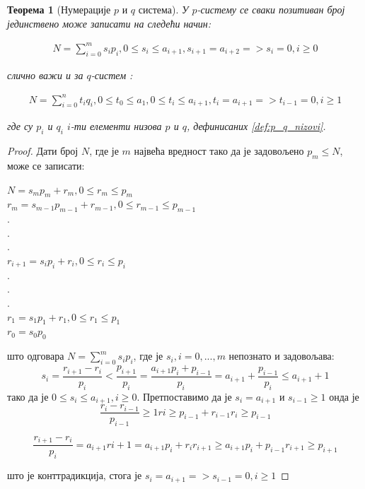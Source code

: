 \documentclass[a4paper]{article}
\newtheorem{theorem}{Теорема}
\begin{document}
\begin{theorem}[Нумерације $ p $ и $ q $ система]
	\label{thm:p_q_sistemi}
	У $ p $-систему се сваки позитиван број јединствено може записати на следећи начин:
	
	\begin{eqnarray}
		N = \sum_{i=0}^{m} s_{i}p_{i}, 0 \le s_{i} \le a_{i+1}, s_{i+1} = a_{i+2} => s_{i}=0 , i \ge 0
	\end{eqnarray}
	
	слично важи и за $ q $-систем :
	
	\begin{eqnarray}
		N = \sum_{i=0}^{n} t_{i}q_{i}, 0 \le t_{0} \le a_{1}, 0 \le t_{i} \le a_{i+1}, t_{i} = a_{i+1} => t_{i-1}=0 , i \ge 1
	\end{eqnarray}
	
	где су $ p_{i} $ и $ q_{i} $ $ i $-ти елементи низова $ p $ и $ q $, дефинисаних \ref{def:p_q_nizovi}.
\end{theorem} 

\begin{proof}
	Дати број $ N $, где је $ m $ највећа вредност тако да је задовољено $ p_{m} \leq N $, може се записати:
	\begin{center}
		$ N = s_{m}p_{m} + r_{m}, 0 \leq r_{m} \le p_{m} $\\
		$ r_{m} = s_{m-1}p_{m-1} + r_{m-1}, 0 \leq r_{m-1} \le p_{m-1} $\\
		$ . $\\
		$ . $\\
		$ . $\\
		$ r_{i+1} = s_{i}p_{i} + r_{i}, 0 \leq r_{i} \le p_{i} $\\
		$ . $\\
		$ . $\\
		$ . $\\
		$ r_{1} = s_{1}p_{1} + r_{1}, 0 \leq r_{1} \le p_{1} $\\
		$ r_{0} = s_{0}p_{0} $
	\end{center}
	што одговара $ N = \sum_{i=0}^{m} s_{i}p_{i} $, где је $ s_{i}, i={0, ..., m} $ непознато и задовољава:
	\begin{displaymath}
		s_{i} = \frac{r_{i+1} - r_{i}}{p_{i}} < \frac{p_{i+1}}{p_{i}} = \frac{a_{i+1}p_{i}+p_{i-1}}{p_{i}} = a_{i+1} + \frac{p_{i-1}}{p_{i}} \leq a_{i+1} + 1 
	\end{displaymath}  
	тако да је $ 0 \leq s_{i} \leq a_{i+1}, i \geq 0 $.
	Претпоставимо да је $ s_{i} = a_{i+1} $ и $ s_{i-1} \geq 1 $ онда је 
	\begin{displaymath}
		\frac{r_{i} - r_{i-1}}{p_{i-1}} \geq 1
		r{i} \geq p_{i-1} + r_{i-1}
		r_{i} \geq p_{i-1}
	\end{displaymath}
	
	\begin{displaymath}
		\frac{r_{i+1} - r_{i}}{p_{i}} = a_{i+1}
		r{i+1} = a_{i+1}p_{i} + r_{i}
		r_{i+1} \geq a_{i+1}p_{i} + p_{i-1}
		r_{i+1} \geq p_{i+1}
	\end{displaymath}
	
	што је конттрадикција, стога је $ s_{i} = a_{i+1} => s_{i-1} = 0 , i \ge 1 $
\end{proof}
\end{document}
